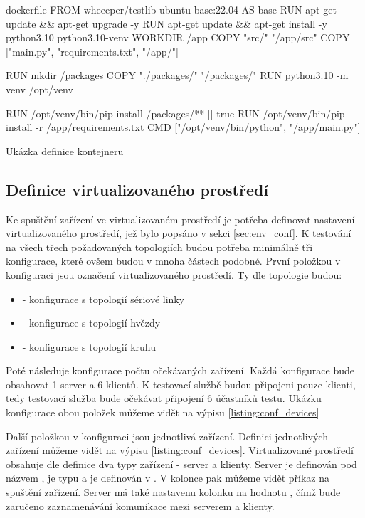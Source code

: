 \begin{listing}[htbp]
    \centering
    \begin{cminted}[breaklines,autogobble, fontsize=\footnotesize]{dockerfile}
FROM wheeeper/testlib-ubuntu-base:22.04 AS base
RUN apt-get update && apt-get upgrade -y
RUN apt-get update && apt-get install -y python3.10 python3.10-venv
WORKDIR /app
COPY "src/" "/app/src"
COPY ["main.py", "requirements.txt", "/app/"]

RUN mkdir /packages
COPY "./packages/" "/packages/"
RUN python3.10 -m venv /opt/venv

RUN /opt/venv/bin/pip install  /packages/** || true
RUN /opt/venv/bin/pip install -r /app/requirements.txt 
CMD ["/opt/venv/bin/python", "/app/main.py"]
    \end{cminted}
\caption{Ukázka definice kontejneru}
\label{listing:dockerfile}
\end{listing}

\subsection{Definice virtualizovaného prostředí}

Ke spuštění zařízení ve virtualizovaném prostředí je potřeba definovat nastavení virtualizovaného prostředí, jež bylo popsáno v sekci \ref{sec:env_conf}. K testování na všech třech požadovaných topologiích budou potřeba minimálně tři konfigurace, které ovšem budou v mnoha částech podobné. První položkou v konfiguraci jsou označení virtualizovaného prostředí. Ty dle topologie budou:

\begin{itemize}
    \item {} - konfigurace s topologií sériové linky
    \item {} - konfigurace s topologií hvězdy
    \item {} - konfigurace s topologií kruhu
\end{itemize}

Poté následuje konfigurace počtu očekávaných zařízení. Každá konfigurace bude obsahovat 1 server a 6 klientů. K testovací službě budou připojeni pouze klienti, tedy testovací služba bude očekávat připojení 6 účastníků testu. Ukázku konfigurace obou položek můžeme vidět na výpisu \ref{listing:conf_devices}

Další položkou v konfiguraci jsou jednotlivá zařízení. Definici jednotlivých zařízení můžeme vidět na výpisu \ref{listing:conf_devices}. Virtualizované prostředí obsahuje dle definice dva typy zařízení - server a klienty. Server je definován pod názvem , je typu  a je definován v . V kolonce  pak můžeme vidět příkaz na spuštění zařízení. Server má také nastavenu kolonku  na hodnotu , čímž bude zaručeno zaznamenávání komunikace mezi serverem a klienty.

